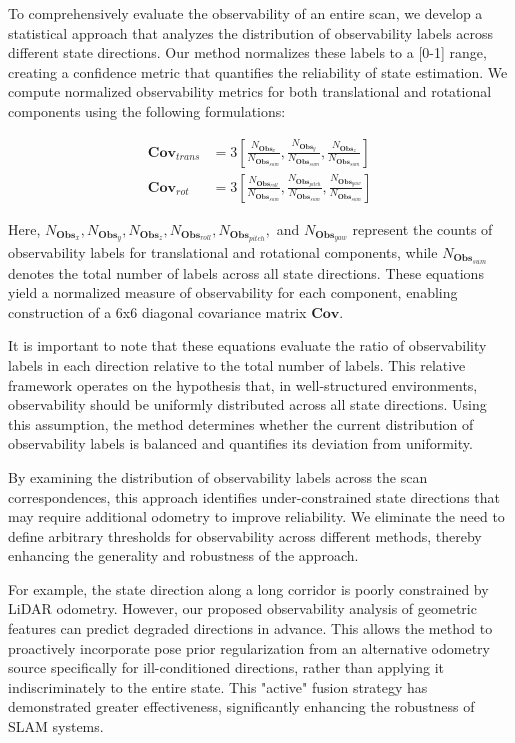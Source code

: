 To comprehensively evaluate the observability of an entire scan, we develop a statistical approach that analyzes the distribution of observability labels across different state directions. Our method normalizes these labels to a [0-1] range, creating a confidence metric that quantifies the reliability of state estimation. We compute normalized observability metrics for both translational and rotational components using the following formulations:

 
\begin{align}
\mathbf{Cov}_{trans} &= 3\left[\frac{N_{\mathbf{Obs}_x} }{N_{\mathbf{Obs}_{sum}} },\frac{N_{\mathbf{Obs}_y} }{N_{\mathbf{Obs}_{sum}} },\frac{N_{\mathbf{Obs}_z} }{N_{\mathbf{Obs}_{sum}} }\right] \\
\mathbf{Cov}_{rot} &= 3\left[\frac{N_{\mathbf{Obs}_{roll}} }{N_{\mathbf{Obs}_{sum}} },\frac{N_{\mathbf{Obs}_{pitch}} }{N_{\mathbf{Obs}_{sum}} },\frac{N_{\mathbf{Obs}_{yaw}} }{N_{\mathbf{Obs}_{sum}} }\right]
\end{align}


Here, \( N_{\mathbf{Obs}_x}, N_{\mathbf{Obs}_y}, N_{\mathbf{Obs}_z}, N_{\mathbf{Obs}_{roll}}, N_{\mathbf{Obs}_{pitch}}, \) and \( N_{\mathbf{Obs}_{yaw}} \) represent the counts of observability labels for translational and rotational components, while \( N_{\mathbf{Obs}_{sum}} \) denotes the total number of labels across all state directions. These equations yield a normalized measure of observability for each component, enabling construction of a 6x6 diagonal covariance matrix \( \mathbf{Cov} \).


It is important to note that these equations evaluate the ratio of observability labels in each direction relative to the total number of labels. This relative framework operates on the hypothesis that, in well-structured environments, observability should be uniformly distributed across all state directions. Using this assumption, the method determines whether the current distribution of observability labels is balanced and quantifies its deviation from uniformity.

By examining the distribution of observability labels across the scan correspondences, this approach identifies under-constrained state directions that may require additional odometry to improve reliability. We eliminate the need to define arbitrary thresholds for observability across different methods, thereby enhancing the generality and robustness of the approach.

For example, the state direction along a long corridor is poorly constrained by LiDAR odometry. However, our proposed observability analysis of geometric features can predict degraded directions in advance. This allows the method to proactively incorporate pose prior regularization from an alternative odometry source specifically for ill-conditioned directions, rather than applying it indiscriminately to the entire state. This "active" fusion strategy has demonstrated greater effectiveness, significantly enhancing the robustness of SLAM systems.



